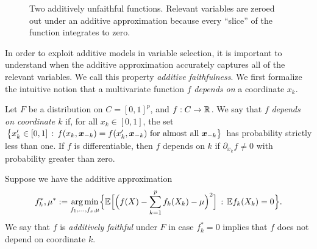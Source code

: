 \begin{figure}[htp]
\vskip-10pt
	\centering
\caption{Two additively unfaithful functions. Relevant variables are
  zeroed out under an additive approximation because every ``slice''
  of the function integrates to zero.}
\vskip-10pt
\end{figure}

In order to exploit additive models in variable selection, it is important to understand when the
additive approximation accurately captures all of the relevant variables.
We call this property \textit{additive faithfulness}. We first formalize the intuitive notion that a multivariate function $f$ \emph{depends on} a coordinate $x_k$.

\begin{definition}
  Let $F$ be a distribution on $C=[0,1]^p$, and $f:C \rightarrow {\mathbb R}$. 
We say that $f$ \textit{depends on coordinate $k$} if, for all $x_k \in [0,1]$, the set 
$\big\{ x'_k \in [0, 1] \,:\, f(x_k, \mbox{\boldmath $x$}_{-k}) = f(x'_k, \mbox{\boldmath $x$}_{-k}) 
\textrm{ for almost all  $\mbox{\boldmath $x$}_{-k}$} \big\}$ 
has probability strictly less than one.
If $f$ is differentiable, then $f$ depends on $k$ if $\partial_{x_k} f \neq 0$ with probability greater than zero.

Suppose we have the additive approximation
\begin{equation}
\label{eqn:unconstrained_additive}
f_k^*, \mu^* := \mathop{\text{\rm arg\,min}}_{f_1,\ldots, f_s, \mu} \Bigl\{ 
             {\mathbb E} \Bigl[\Bigl( f(X) - \sum_{k=1}^p f_k(X_k) -\mu \Bigr)^2 \Bigr]
         \,:\, {\mathbb E} f_k(X_k) = 0 \Bigr\}.
\end{equation}
We say that $f$ is \textit{additively faithful} under $F$ in case
$f^*_k = 0$ implies that $f$ does not depend on coordinate $k$.
\end{definition}

